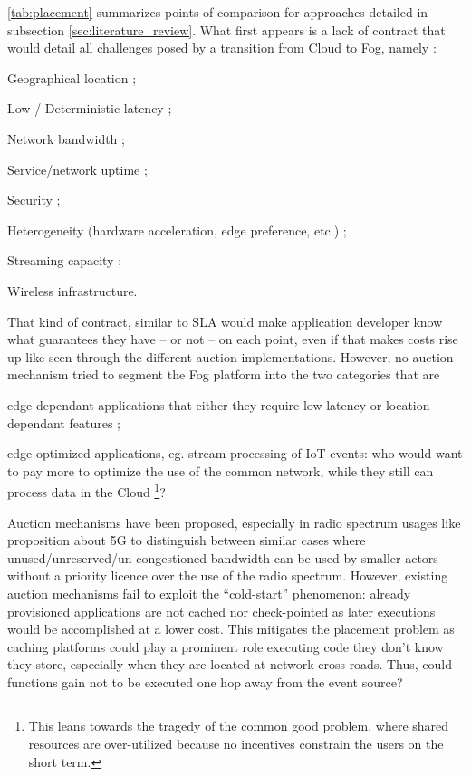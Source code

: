 \documentclass[11pt]{sdm}
\begin{document}
\cref{tab:placement} summarizes points of comparison for approaches detailed in subsection \cref{sec:literature_review}. What first appears is a lack of contract that would detail all challenges posed by a transition from Cloud to Fog, namely \cite{chiang_fog_2016, bonomi_fog_2012}:
\begin{enumerate*}[(I)]
	\item Geographical location ;
	\item Low / Deterministic latency ;
	\item Network bandwidth ;
	\item Service/network uptime ;
	\item Security ;
	\item Heterogeneity (hardware acceleration, edge preference, etc.) ;
	\item Streaming capacity ;
	\item Wireless infrastructure.
\end{enumerate*}
That kind of contract, similar to \gls{SLA} would make application developer know what guarantees they have -- or not -- on each point, even if that makes costs rise up like seen through the different auction implementations. However, no auction mechanism tried to segment the Fog platform into the two categories that are 
\begin{enumerate*}[(A)]
	\item edge-dependant applications that either they require low latency or location-dependant features ;
	\item edge-optimized applications, eg. stream processing of \gls{IoT} events: who would want to pay more to optimize the use of the common network, while they still can process data in the Cloud \footnote{This leans towards the tragedy of the common good problem, where shared resources are over-utilized because no incentives constrain the users on the short term.}?
\end{enumerate*}
Auction mechanisms have been proposed, especially in radio spectrum usages like  proposition about 5G to distinguish between similar cases where unused/unreserved/un-congestioned bandwidth can be used by smaller actors without a priority licence over the use of the radio spectrum.
However, existing auction mechanisms fail to exploit the ``cold-start'' phenomenon: already provisioned applications are not cached nor check-pointed \cite{karhula_checkpointing_2019} as later executions would be accomplished at a lower cost. This mitigates the placement problem as caching platforms could play a prominent role executing code they don't know they store, especially when they are located at network cross-roads. Thus, could functions gain not to be executed one hop away from the event source?
\end{document}
